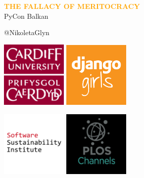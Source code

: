 \documentclass{beamer}
\begin{document}
\begin{frame}
    \begin{center}
        \LARGE{\textbf{\textcolor{orange}{THE FALLACY OF MERITOCRACY}}} \\

        \vspace{1.5cm}
        \normalsize{PyCon Balkan}

        \vspace{1cm}
        \normalsize{@NikoletaGlyn}

    \end{center}
\end{frame}

\begin{frame}
    \begin{center}
    \includegraphics[width=0.24\textwidth]{static/cardiff_uni_logo.png}\hspace{6pt}
    \includegraphics[width=0.24\textwidth, height=0.245\textwidth]{static/django_girls.png}\vspace{10pt}

    \includegraphics[width=0.24\textwidth]{static/ssi-logo.png} \hspace{6pt}
    \includegraphics[width=0.24\textwidth]{static/plos-logo.jpg}

    \end{center}
\end{frame}
\end{document}
